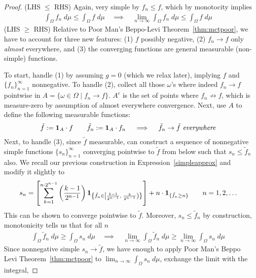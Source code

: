 \documentclass[12pt]{article}
\theoremstyle{plain}
\theoremstyle{definition}
\theoremstyle{remark}
\newcommand{\ra}{\rightarrow}
\newcommand{\one}[1]{\mathbf{1}_{#1}}
\newcommand{\ninf}{_{n=1}^\infty}
\newcommand{\limn}{\lim_{n\rightarrow\infty}}
\begin{document}
\begin{proof}
(LHS $\leq$ RHS)
Again, very simple by $f_n\leq f$, which by monotocity implies
\begin{align*}
  \int_\Omega f_n\;d\mu
  \leq
  \int_\Omega f\;d\mu
  \quad\implies\quad
  \limn \int_\Omega f_n\;d\mu
  \leq
  \int_\Omega f\;d\mu
\end{align*}
(LHS $\geq$ RHS)
Relative to Poor Man's Beppo-Levi Theorem~\ref{thm:mctpoor},
we have to account for three new features:
(1) $f$ possibly negative, (2) $f_n\ra f$ only \emph{almost} everywhere,
and (3) the converging functions are general measurable (non-simple)
functions.

To start, handle (1) by assuming $g= 0$ (which we relax later),
implying $f$ and $\{f_n\}\ninf$ nonnegative.
To handle (2), collect all those $\omega$'s where indeed $f_n\ra f$
pointwise in $A = \{\omega\in\Omega \;|\; f_n\ra f\}$.
$A^c$ is the set of points where $f_n\not\ra f$, which is measure-zero
by assumption of almost everywhere convergence.
Next, use $A$ to define the following measurable functions:
\begin{align*}
  \tilde{f} := \one{A} \cdot f
  \qquad \tilde{f}_n := \one{A} \cdot f_n
  \quad\implies\quad
  \text{$\tilde{f}_n\ra \tilde{f}$ \emph{everywhere}}
\end{align*}
Next, to handle (3), since $\tilde{f}$ measurable, can construct a
sequence of nonnegative simple functions $\{s_n\}\ninf$
converging pointwise to $\tilde{f}$ from below such that
$s_n\leq \tilde{f}_n$ also.
We recall our previous construction in Expression~\ref{simpleapprox} and
modify it slightly to
\begin{align}
  s_n = \left[
  \sum^{n\cdot 2^{n-1}}_{k=1}
  \left(
  \frac{k-1}{2^{n-1}}
  \right)
  \one{%
    \left\{
      \tilde{f}_n\in \left[\frac{k-1}{2^{n-1}}, \; \frac{k}{2^{n-1}}\right)
    \right\}
  }
  \right]
  + n \cdot \one{\{\tilde{f}_n\geq n\}}
  \qquad n=1,2,\ldots
  \label{simpleapprox2}
\end{align}
This can be shown to converge pointwise to $\tilde{f}$.
Moreover, $s_n\leq \tilde{f}_n$ by construction, monotonicity tells us
that for all $n$
\begin{align*}
  \int_\Omega \tilde{f}_n\;d\mu
  \geq
  \int_\Omega s_n\;d\mu
  \quad\implies\quad
  \limn \int_\Omega \tilde{f}_n\;d\mu
  \geq
  \limn \int_\Omega s_n\;d\mu
\end{align*}
Since nonnegative simple $s_n\ra\tilde{f}$, we have enough to apply Poor
Man's Beppo Levi Theorem~\ref{thm:mctpoor}
to $\limn \int_\Omega s_n\;d\mu$, exchange the limit with the integral,

\end{proof}
\end{document}
